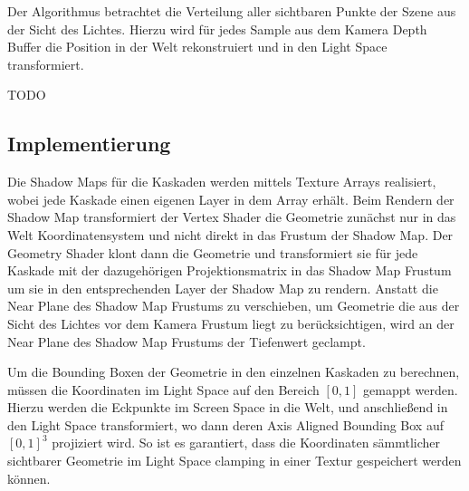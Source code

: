 \documentclass[runningheaders,a4paper]{llncs}
\begin{document}
Der Algorithmus betrachtet die Verteilung aller sichtbaren Punkte der Szene aus der Sicht des Lichtes.
Hierzu wird für jedes Sample aus dem Kamera Depth Buffer die Position in der Welt rekonstruiert und in den Light Space transformiert.



TODO


\subsection{Implementierung}

Die Shadow Maps für die Kaskaden werden mittels Texture Arrays realisiert, wobei jede Kaskade einen eigenen Layer in dem Array erhält.
Beim Rendern der Shadow Map transformiert der Vertex Shader die Geometrie zunächst nur in das Welt Koordinatensystem und nicht direkt in das Frustum der Shadow Map.
Der Geometry Shader klont dann die Geometrie und transformiert sie für jede Kaskade mit der dazugehörigen Projektionsmatrix in das Shadow Map Frustum um sie in den entsprechenden Layer der Shadow Map zu rendern.
Anstatt die Near Plane des Shadow Map Frustums zu verschieben, um Geometrie die aus der Sicht des Lichtes vor dem Kamera Frustum liegt zu berücksichtigen, wird an der Near Plane des Shadow Map Frustums der Tiefenwert geclampt.


Um die Bounding Boxen der Geometrie in den einzelnen Kaskaden zu berechnen, müssen die Koordinaten im Light Space auf den Bereich $[0, 1]$ gemappt werden.
Hierzu werden die Eckpunkte im Screen Space in die Welt, und anschließend in den Light Space transformiert, wo dann deren Axis Aligned Bounding Box auf $[0, 1]^3$ projiziert wird.
So ist es garantiert, dass die Koordinaten sämmtlicher sichtbarer Geometrie im Light Space clamping in einer Textur gespeichert werden können.
\end{document}
